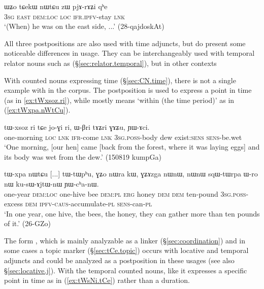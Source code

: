  \begin{exe}
\ex \label{ex:tCAkW.nWtCu.zW}
\gll   ɯʑo tɕekɯ nɯtɕu zɯ pjɤ-rɤʑi qʰe \\
\textsc{3sg} \textsc{east} \textsc{dem}:\textsc{loc} \textsc{loc} \textsc{ifr}.\textsc{ipfv}-stay \textsc{lnk}  \\
\glt `(When) he was on the east side, ...' (28-qajdoskAt) 
  \end{exe}
   
All three postpositions are also used with time adjuncts, but do present some noticeable differences in usage. They can be interchangeably used with temporal relator nouns such as  (§\ref{sec:relator.temporal}), but in other contexts 

With counted nouns expressing time (§\ref{sec:CN.time}), there is not a single example with  in the corpus. The postposition  is used to express a point in time  (as in \ref{ex:tWxsoz.ri}), while  mostly means `within (the time period)' as in (\ref{ex:tWxpa.nWtCu}).  

\begin{exe}
\ex \label{ex:tWxsoz.ri}
\gll tɯ-xsoz ri tɕe jo-ɣi ri, ɯ-βri tɤʑri ɣɤʑu, ɲɯ-ɤci. \\
one-morning \textsc{loc} \textsc{lnk} \textsc{ifr}-come \textsc{lnk} \textsc{3sg}.\textsc{poss}-body dew exist:\textsc{sens} \textsc{sens}-be.wet \\
\glt `One morning, [our hen] came [back from the forest, where it was laying eggs] and its body was wet from the dew.' (150819 kumpGa) 
\end{exe}

\begin{exe}
\ex \label{ex:tWxpa.nWtCu}
\gll  tɯ-xpa nɯtɕu [...] tɯ-tɯpʰu, ɣʑo nɯra kɯ, ɣʑɤzga nɯnɯ, nɯnɯ sqɯ-tɯrpa ɯ-ro nɯ ku-sɯ-ɤjtɯ-nɯ ɲɯ-cʰa-nɯ. \\
one-year \textsc{dem}:\textsc{loc} { } one-hive bee \textsc{dem}:\textsc{pl} \textsc{erg} honey \textsc{dem} \textsc{dem} ten-pound \textsc{3sg}.\textsc{poss}-excess \textsc{dem} \textsc{ipfv}-\textsc{caus}-accumulate-\textsc{pl} \textsc{sens}-can-\textsc{pl} \\
\glt  `In one year, one hive, the bees, the honey, they can gather more than ten pounds of it.' (26-GZo) 	
\end{exe}

The form , which  is mainly analyzable as a linker (§\ref{sec:coordination}) and in some cases a topic marker (§\ref{sec:tCe.topic}) occurs with locative and temporal adjuncts and could be analyzed as a postposition in these usages (see also §\ref{sec:locative.j}). With the temporal counted nouns, like  it expresses a specific point in time as in (\ref{ex:tWsNi.tCe}) rather than a duration.

